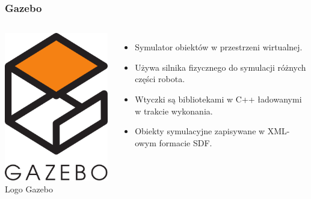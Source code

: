 \documentclass{beamer}
\begin{document}
	\begin{frame}
		\frametitle{Gazebo}
		\begin{columns}[c]
			\includegraphics[width=\textwidth]{graphics/gazebo_logo.png} \\
			Logo Gazebo\footnotemark
			\begin{itemize}
				\item Symulator obiektów w przestrzeni wirtualnej.
				\item Używa silnika fizycznego do symulacji różnych części robota.
				\item Wtyczki są bibliotekami w C++ ładowanymi w trakcie wykonania.
				\item Obiekty symulacyjne zapisywane w XML-owym formacie SDF.
			\end{itemize}
		\end{columns}
	\end{frame}
\end{document}
